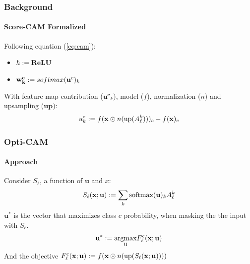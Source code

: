 \begin{frame}[t]
    \frametitle{Background}
    \framesubtitle{Score-CAM Formalized}
    \small
    Following equation (\ref{eq:cam}):\pause
    \begin{itemize}
        \item $h\mathrel{:=}\mathbf{ReLU}$
        \item $\mathbf{w^c_k} \mathrel{:=} softmax(\mathbf{u}^c)_k$
    \end{itemize}
    \pause
    \vspace{20pt}
    With feature map contribution ($\mathbf{u^c}_k$), model ($f$), normalization ($n$) and upsampling ($\mathbf{up}$):
    \begin{equation}
        u^c_k \mathrel{:=} f (\mbox{\textbf{x}} \odot n(\mbox{up}(A^k_\ell)))_c - f(\mbox{\textbf{x}})_c
        \label{eq:inc_conf}
    \end{equation}
    \vspace{10pt}
\end{frame}
\begin{frame}[t]
    \frametitle{Opti-CAM}
    \framesubtitle{Approach}
    \small
    \pause
    Consider $S_\ell $, a function of $\mathbf{u}$ and $x$:
    \begin{equation}
        S_\ell(\mathbf{x; u})\mathrel{:=} \sum_k \mbox{softmax}(\mathbf{u})_kA^k_\ell
    \end{equation}
    \pause
    $\mathbf{u^*}$ is the vector that maximizes class $c$ probability, when masking the  the input with $S_\ell$.
    \begin{equation}
        \mathbf{u^*} \mathrel{:=} \underset{\mbox{u}}{\mbox{argmax}} F^c_\ell(\mathbf{x;u})
    \end{equation}
    And the objective $F^c_\ell(\mathbf{x;u}) \mathrel{:=} f(\mathbf{x}\odot n(\mbox{up}(S_\ell(\mathbf{x; u}))))$  

\end{frame}
